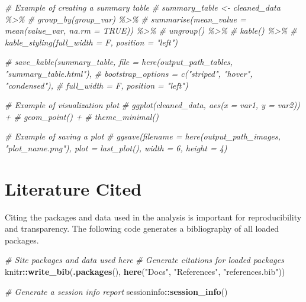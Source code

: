 \documentclass[
]{article}
\newenvironment{Shaded}{\begin{snugshade}}{\end{snugshade}}
\newcommand{\CommentTok}[1]{\textcolor[rgb]{0.56,0.35,0.01}{\textit{#1}}}
\newcommand{\FunctionTok}[1]{\textcolor[rgb]{0.13,0.29,0.53}{\textbf{#1}}}
\newcommand{\NormalTok}[1]{#1}
\newcommand{\SpecialCharTok}[1]{\textcolor[rgb]{0.81,0.36,0.00}{\textbf{#1}}}
\newcommand{\StringTok}[1]{\textcolor[rgb]{0.31,0.60,0.02}{#1}}
\begin{document}
\begin{Shaded}
\begin{Highlighting}[]
\CommentTok{\# Example of creating a summary table }
\CommentTok{\# summary\_table \textless{}{-} cleaned\_data \%\textgreater{}\%}
\CommentTok{\#   group\_by(group\_var) \%\textgreater{}\%}
\CommentTok{\#   summarise(mean\_value = mean(value\_var, na.rm = TRUE)) \%\textgreater{}\%}
\CommentTok{\#   ungroup() \%\textgreater{}\%}
\CommentTok{\#   kable() \%\textgreater{}\%}
\CommentTok{\#   kable\_styling(full\_width = F, position = "left") }

\CommentTok{\# save\_kable(summary\_table, file = here(output\_path\_tables, "summary\_table.html"),}
\CommentTok{\#   bootstrap\_options = c("striped", "hover", "condensed"),}
\CommentTok{\#   full\_width = F, position = "left")}
\end{Highlighting}
\end{Shaded}

\begin{Shaded}
\begin{Highlighting}[]
\CommentTok{\# Example of visualization plot}
\CommentTok{\# ggplot(cleaned\_data, aes(x = var1, y = var2)) +}
\CommentTok{\#   geom\_point() +}
\CommentTok{\#   theme\_minimal()}

\CommentTok{\# Example of saving a plot}
\CommentTok{\# ggsave(filename = here(output\_path\_images, "plot\_name.png"), plot = last\_plot(), width = 6, height = 4)}
\end{Highlighting}
\end{Shaded}

\section{Literature Cited}\label{literature-cited}

Citing the packages and data used in the analysis is important for
reproducibility and transparency. The following code generates a
bibliography of all loaded packages.

\begin{Shaded}
\begin{Highlighting}[]
\CommentTok{\# Site packages and data used here }
\CommentTok{\# Generate citations for loaded packages}
\NormalTok{knitr}\SpecialCharTok{::}\FunctionTok{write\_bib}\NormalTok{(}\FunctionTok{.packages}\NormalTok{(), }\FunctionTok{here}\NormalTok{(}\StringTok{"Docs"}\NormalTok{, }\StringTok{"References"}\NormalTok{, }\StringTok{"references.bib"}\NormalTok{))}

\CommentTok{\# Generate a session info report}
\NormalTok{sessioninfo}\SpecialCharTok{::}\FunctionTok{session\_info}\NormalTok{()}
\end{Highlighting}
\end{Shaded}
\end{document}
